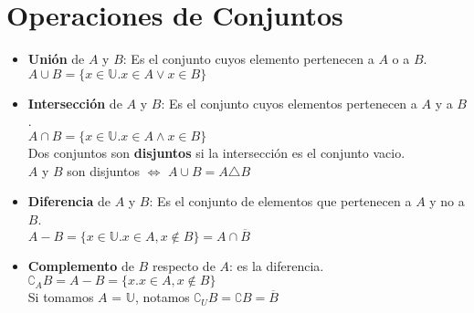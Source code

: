\documentclass[11pt,a4paper]{article}
\begin{document}
\section{Operaciones de Conjuntos}
\begin{itemize}
\item \textbf{Uni\'on} de $A$ y $B$: Es el conjunto cuyos elemento pertenecen a $A$ o a $B$.\\
$A \cup B = \{x\in \mathbb{U} . x\in A \lor x\in B\}$

\item \textbf{Intersecci\'on} de $A$ y $B$: Es el conjunto cuyos elementos pertenecen a $A$ y a $B$.\\
$A \cap B = \{x\in \mathbb{U} . x\in A \land x\in B\}$\\
Dos conjuntos son \textbf{disjuntos} si la intersecci\'on es el conjunto vacio.\\
$A$ y $B$ son disjuntos $\iff$ $A \cup B = A \triangle B$

\item \textbf{Diferencia} de $A$ y $B$: Es el conjunto de elementos que pertenecen a $A$ y no a $B$.\\
$A - B = \{x\in \mathbb{U}.x\in A, x\not \in B\} = A \cap \overline{B}$
\begin{itemize}
\end{itemize}

\item \textbf{Complemento} de $B$ respecto de $A$: es la diferencia.\\
$\complement_A B = A-B = \{x.x\in A, x\not \in B\}$\\
Si tomamos $A$ = $\mathbb{U}$, notamos $\complement_U B = \complement B = \overline{B}$
\begin{itemize}
\end{itemize}


\end{itemize}
\end{document}
